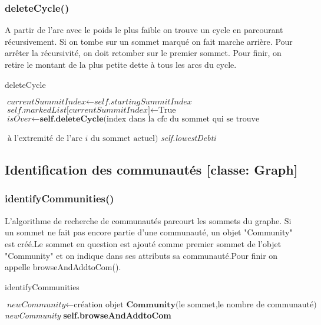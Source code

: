 \documentclass[a4paper]{article}
\begin{document}
\subsubsection{deleteCycle()}
A partir de l'arc avec le poids le plus faible on trouve un cycle en parcourant récursivement. Si on tombe sur un sommet marqué on fait marche arrière. Pour arrêter la récursivité, on doit retomber sur le premier sommet. Pour finir, on retire le montant de la plus petite dette à tous les arcs du cycle.
\begin{algorithm}[H]
\caption{deleteCycle}\label{deleteCycle}
\begin{algorithmic}[1]
\State $\textit{currentSummitIndex}\gets \textit{self.startingSummitIndex}$
\EndIf
{}
\State {}
\State {}
\Else
\State $\textit{self.markedList}\text{[}\textit{currentSummitIndex}\text{]}\gets \text{True}$
\State $\textit{isOver} \gets \textbf{self.deleteCycle}\text{(index dans la cfc du sommet qui se trouve}$

$\text{ à l'extremité de l'arc }\textit{i}\text{ du sommet actuel)}$
\State {}\textit{self.lowestDebt}\textit{i}
\State {}
\EndIf
\EndFor
\State {}
\EndIf
\EndProcedure
\end{algorithmic}
\end{algorithm}
\subsection{Identification des communautés [classe: Graph] }
\subsubsection{identifyCommunities()}
L'algorithme de recherche de communautés parcourt les sommets du graphe. Si un sommet ne fait pas encore partie d'une communauté, un objet "Community" est créé.Le sommet en question est ajouté comme premier sommet de l'objet "Community" et on indique dans ses attributs sa communauté.Pour finir on appelle browseAndAddtoCom().
\begin{algorithm}[H]
\caption{identifyCommunities}\label{identify}
\begin{algorithmic}[1]
\State $\textit{newCommunity}\gets \text{création objet }\textbf{Community}\text{(le sommet,le nombre de communauté)}$
\State {}
\State {}\textit{newCommunity}
\State \textbf{self.browseAndAddtoCom}
\EndIf
\EndFor
\EndProcedure
\end{algorithmic}
\end{algorithm}
\end{document}

